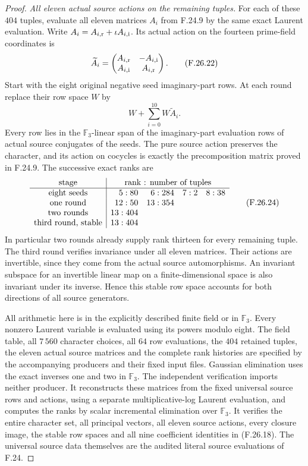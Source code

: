 \begin{proof}
\emph{All eleven actual source actions on the remaining tuples.}
For each of these $404$ tuples, evaluate all eleven
matrices $A_i$ from F.24.9 by the same exact
Laurent evaluation. Write $A_i=A_{i,\rm r}
+\iota A_{i,\rm i}$. Its actual action on the
fourteen prime-field coordinates is
\[
 \widetilde A_i=
 \begin{pmatrix}
 A_{i,\rm r}&-A_{i,\rm i}\\
 A_{i,\rm i}& A_{i,\rm r}
 \end{pmatrix}.                                               \tag{F.26.22}
\]
Start with the eight original negative seed
imaginary-part rows. At each round replace their
row space $W$ by
\[
                 W+\sum_{i=0}^{10}W\widetilde A_i .
                                                               \tag{F.26.23}
\]
Every row lies in the $\mathbb F_3$-linear span of the
imaginary-part evaluation rows of actual source
conjugates of the seeds.
The pure source action preserves the character,
and its action on cocycles is exactly the
precomposition matrix proved in F.24.9.
The successive exact ranks are
\[
 \begin{array}{c|rrrr}
 \text{stage}&\multicolumn{4}{c}{\text{rank : number of tuples}}\\\hline
 \text{eight seeds}&5:80&6:284&7:2&8:38\\
 \text{one round}&12:50&13:354&&\\
 \text{two rounds}&13:404&&&\\
 \text{third round, stable}&13:404&&&
 \end{array}                                                  \tag{F.26.24}
\]
In particular two rounds already supply rank
thirteen for every remaining tuple. The third
round verifies invariance under all eleven
matrices. Their actions are invertible, since
they come from the actual source automorphisms.
An invariant subspace for an invertible linear
map on a finite-dimensional space is also
invariant under its inverse. Hence this stable
row space accounts for both directions of all
source generators.

All arithmetic here is in the explicitly described
finite field or in $\mathbb F_3$. Every nonzero
Laurent variable is evaluated using its powers
modulo eight. The field table, all $7\,560$
character choices, all $64$ row evaluations,
the $404$ retained tuples, the eleven actual
source matrices and the complete rank histories
are specified by the accompanying producers
and their fixed input files. Gaussian elimination
uses the exact inverses one and two in
$\mathbb F_3$. The independent verification imports
neither producer. It reconstructs these matrices
from the fixed universal source rows and actions,
using a separate multiplicative-log Laurent evaluation,
and computes the ranks by scalar incremental elimination
over $\mathbb F_3$. It verifies the entire character set,
all principal vectors, all eleven source actions,
every closure image, the stable row spaces and all
nine coefficient identities in (F.26.18). The universal
source data themselves are the audited literal source
evaluations of F.24.


\end{proof}
